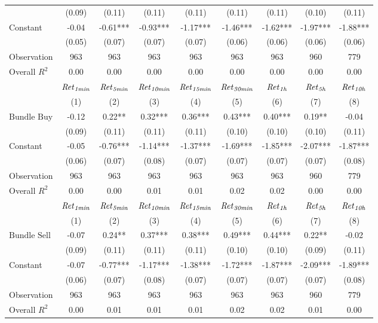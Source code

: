 \begin{tabular}{lcccccccc}
 & (0.09) & (0.11) & (0.11) & (0.11) & (0.11) & (0.11) & (0.10) & (0.11) \\
Constant & -0.04 & -0.61*** & -0.93*** & -1.17*** & -1.46*** & -1.62*** & -1.97*** & -1.88*** \\
 & (0.05) & (0.07) & (0.07) & (0.07) & (0.06) & (0.06) & (0.06) & (0.06) \\
Observation & 963 & 963 & 963 & 963 & 963 & 963 & 960 & 779 \\
Overall $R^2$ & 0.00 & 0.00 & 0.00 & 0.00 & 0.00 & 0.00 & 0.00 & 0.00 \\
\hline
 & ${\it Ret}_{\it 1min}$ & ${\it Ret}_{\it 5min}$ & ${\it Ret}_{\it 10min}$ & ${\it Ret}_{\it 15min}$ & ${\it Ret}_{\it 30min}$ & ${\it Ret}_{\it 1h}$ & ${\it Ret}_{\it 5h}$ & ${\it Ret}_{\it 10h}$ \\
 & (1) & (2) & (3) & (4) & (5) & (6) & (7) & (8) \\
\hline
$\text{Bundle Buy}$ & -0.12 & 0.22** & 0.32*** & 0.36*** & 0.43*** & 0.40*** & 0.19** & -0.04 \\
 & (0.09) & (0.11) & (0.11) & (0.11) & (0.10) & (0.10) & (0.10) & (0.11) \\
Constant & -0.05 & -0.76*** & -1.14*** & -1.37*** & -1.69*** & -1.85*** & -2.07*** & -1.87*** \\
 & (0.06) & (0.07) & (0.08) & (0.07) & (0.07) & (0.07) & (0.07) & (0.08) \\
Observation & 963 & 963 & 963 & 963 & 963 & 963 & 960 & 779 \\
Overall $R^2$ & 0.00 & 0.00 & 0.01 & 0.01 & 0.02 & 0.02 & 0.00 & 0.00 \\
\hline
 & ${\it Ret}_{\it 1min}$ & ${\it Ret}_{\it 5min}$ & ${\it Ret}_{\it 10min}$ & ${\it Ret}_{\it 15min}$ & ${\it Ret}_{\it 30min}$ & ${\it Ret}_{\it 1h}$ & ${\it Ret}_{\it 5h}$ & ${\it Ret}_{\it 10h}$ \\
 & (1) & (2) & (3) & (4) & (5) & (6) & (7) & (8) \\
\hline
$\text{Bundle Sell}$ & -0.07 & 0.24** & 0.37*** & 0.38*** & 0.49*** & 0.44*** & 0.22** & -0.02 \\
 & (0.09) & (0.11) & (0.11) & (0.11) & (0.10) & (0.10) & (0.09) & (0.11) \\
Constant & -0.07 & -0.77*** & -1.17*** & -1.38*** & -1.72*** & -1.87*** & -2.09*** & -1.89*** \\
 & (0.06) & (0.07) & (0.08) & (0.07) & (0.07) & (0.07) & (0.07) & (0.08) \\
Observation & 963 & 963 & 963 & 963 & 963 & 963 & 960 & 779 \\
Overall $R^2$ & 0.00 & 0.01 & 0.01 & 0.01 & 0.02 & 0.02 & 0.01 & 0.00 \\
\hline
\end{tabular}
